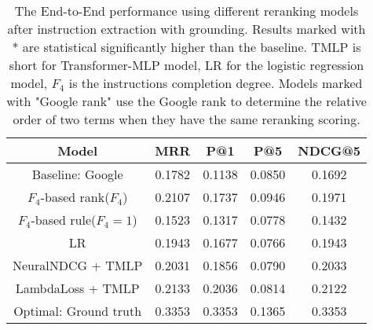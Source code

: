 \begin{table}[ht]
	\caption{The End-to-End performance using different reranking models after instruction extraction with grounding. Results marked with * are statistical significantly higher than the baseline. TMLP is short for Transformer-MLP model, LR for the logistic regression model, $F_4$ is the instructions completion degree. Models marked with "Google rank" use the Google rank to determine the relative order of two terms when they have the same reranking scoring.}
	\label{tab:reranking_end_to_end_performance}
	\begin{tabular}{c|cccc}
			\textbf{Model}                             & \textbf{MRR} & \textbf{P@1} & \textbf{P@5} & \textbf{NDCG@5} \\
			\toprule
			Baseline: Google            & 0.1782       & 0.1138       & 0.0850       & 0.1692          \\
			$F_4$-based rank($F_4$)     & 0.2107       & 0.1737       & 0.0946       & 0.1971          \\ %
			$F_4$-based rule($F_4 = 1$) & 0.1523       & 0.1317       & 0.0778       & 0.1432          \\ %
			LR                          & 0.1943       & 0.1677       & 0.0766       & 0.1943          \\
			NeuralNDCG + TMLP           & 0.2031       & 0.1856       & 0.0790       & 0.2033          \\
			LambdaLoss + TMLP           & 0.2133       & 0.2036       & 0.0814       & 0.2122          \\
			Optimal: Ground truth       & 0.3353       & 0.3353       & 0.1365       & 0.3353          \\
	\end{tabular}
\end{table}